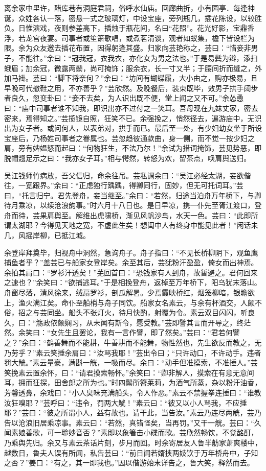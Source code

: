 \documentclass[]{article}
\begin{document}
离余家中里许，醋库巷有洞庭君祠，俗呼水仙庙。回廊曲折，小有园亭．每逢神诞，众姓各认一落，密悬一式之玻璃灯，中设宝座，旁列瓶几，插花陈设，以较胜负。日惟演戏，夜则参差高下，插烛于瓶花间，名曰``花照''。花光好影，宝鼎香浮，若龙宫夜宴。司事者或笙箫歌唱，或煮茗清谈，观者如蚁集，檐下皆设栏为限。余为众友邀去插花布置，因得躬逢其盛。归家向芸艳称之，芸曰：``惜妾非男子，不能往。''余曰：``冠我冠，衣我衣，亦化女为男之法也。''于是易鬓为辫，添扫蛾眉；加余冠，微露两鬃，尚可掩饰；服余衣，长一寸又半；于腰间折而缝之，外加马褂。芸曰：``脚下将奈何？''余曰：``坊间有蝴蝶履，大小由之，购亦极易，且早晚可代撤鞋之用，不亦善乎？''芸欣然。及晚餐后，装束既毕，效男子拱手阔步者良久，忽变卦曰：``妾不去矣，为人识出既不便，堂上闻之又不可。''余怂恿曰：``庙中司事者谁不知我，即识出亦不过付之一笑耳。吾母现在九妹丈家，密去密来，焉得知之。''芸揽镜自照，狂笑不已。余强挽之，悄然径去，遍游庙中，无识出为女子者。或问何人，以表弟对，拱手而已。最后至一处，有少妇幼女坐于所设宝座后，乃杨姓司事者之眷属也。芸忽趋彼通款曲，身一侧，而不觉一按少妇之肩，旁有婢媪怒而起曰：``何物狂生，不法乃尔！''余试为措词掩饰，芸见势恶，即脱帽翘足示之曰：``我亦女子耳。''相与愕然，转怒为欢，留茶点，唤肩舆送归。

吴江钱师竹病放，吾父信归，命余往吊。芸私调余曰：``吴江必经太湖，妾欲偕往，一宽跟界。''余曰：``正虑独行踽踽，得卿同行，固妙，但无可托词耳。''芸曰，``托言归宁。君先登舟，妾当继至。''余曰：``若然，归途当泊舟万年桥下，与卿待月乘凉，以续沧浪韵事。''时六月十八日也。是日早凉，携一仆先至胥江渡口，登舟而待，芸果肩舆至。解维出虎啸桥，渐见风帆沙鸟，水天一色。芸曰：``此即所谓太湖耶？今得见天地之宽，不虚此生矣！想闺中人有终身中能见此者！''闲话未几，风摇岸柳，已抵江城。

余登岸拜奠毕，归视舟中洞然，急询舟子。舟子指曰：``不见长桥柳阴下，观鱼鹰捕鱼者乎？''盖芸已与船家女登岸矣。余至其后，芸犹粉汗盈盈，倚女而出神焉。余拍其肩口：``罗衫汗透矣！''芜回首曰：``恐钱家有人到舟，故暂避之。君何回来之速也？''余笑曰：``欲捕逃耳。''于是相挽登舟，返棹至万年桥下，阳乌犹末落山。舟窗尽落，清风徐来，绒扇罗衫，剖瓜解暑。少焉霞映桥红，烟笼柳暗，银瞻欲上，渔火满江矣。命仆至船梢与舟子同饮。船家女名素云，与余有杯酒交，人颇不俗，招之与芸同坐。船头不张灯火，待月快酌，射覆为令。素云双目闪闪，听良久，曰：``觞政侬颇娴习，从未闻有斯令，愿受教。''芸即譬其言而开导之，终茫然。余笑曰：``女先生且罢论，我有一言作譬，即了然矣。''芸曰：``君若何譬之？''余曰：``鹤善舞而不能耕，牛善耕而不能舞，物性然也，先生欲反而教之，无乃劳乎？''素云笑捶余肩曰：``汝骂我耶！''芸出令曰；``只许动口，不许动手。违者罚大觥。''素云量豪，满斟一觥，一吸而尽。余曰：``动手但准摸索，不准捶人。''芸笑挽素云置余怀，曰：``请君摸索畅怀。''余笑曰：``卿非解人，摸索在有意无意间耳，拥而狂探，田舍郎之所为也。''时四鬃所簪莱莉，为酒气所蒸，杂以粉汗油香，芳馨透鼻，余戏曰：``小人臭味充满船头，令人作恶。''素云不禁握拳连捶曰：``谁教汝狂嗅耶？''芸呼曰：``违令，罚两大觥！''素云曰：``彼又以小人骂我，不应捶耶？''芸曰：``彼之所谓小人，益有故也。请干此，当告汝。''素云乃连尽两觥，芸乃告以沧浪旧居乘凉事。素云曰：``若然，真错怪矣，当再罚。''又干一觥。芸曰：``久闻素娘善歌，可一聆妙音否？''素即以象箸击小碟而歌。芸欣然畅饮，不觉酩酊，乃乘舆先归。余又与素云茶话片刻，步月而回。时余寄居友人鲁半舫家萧爽楼中，越数日，鲁夫人误有所闻，私告芸曰：``前日闻若婿挟两妓饮于万年桥舟中，子知之否？''姜口：``有之，其一即我也。''因以偕游始末详告之，鲁大笑，释然而去。
\end{document}
